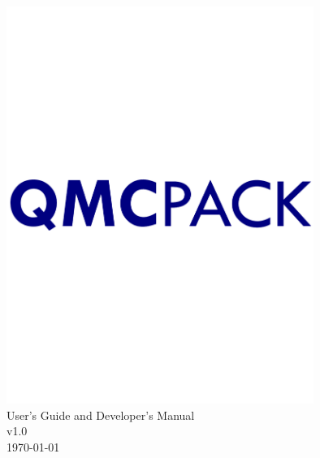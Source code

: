 
  \begin{center}
\includegraphics[width=10cm]{figures/QMCPACK_logo.pdf}\\
{\huge User's Guide and Developer's Manual \\}
{\huge v1.0\\ \today}

  \end{center}
